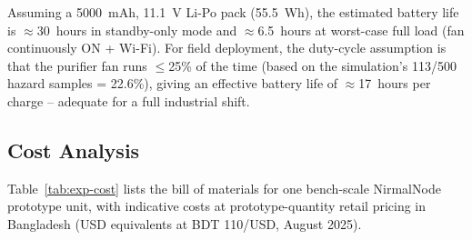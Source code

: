 \begin{table}[htbp]
\centering
\caption{Measured power consumption by subsystem}
\label{tab:exp-power}


\end{table}

\noindent Assuming a 5000~mAh, 11.1~V Li-Po pack (55.5~Wh), the estimated battery life is $\approx$30~hours in standby-only mode and $\approx$6.5~hours at worst-case full load (fan continuously ON + Wi-Fi). For field deployment, the duty-cycle assumption is that the purifier fan runs $\leq$25\% of the time (based on the simulation's 113/500 hazard samples = 22.6\%), giving an effective battery life of $\approx$17~hours per charge -- adequate for a full industrial shift.

\subsection{Cost Analysis}
\label{sec:exp-cost}

Table~\ref{tab:exp-cost} lists the bill of materials for one bench-scale NirmalNode prototype unit, with indicative costs at prototype-quantity retail pricing in Bangladesh (USD equivalents at BDT 110/USD, August 2025).

